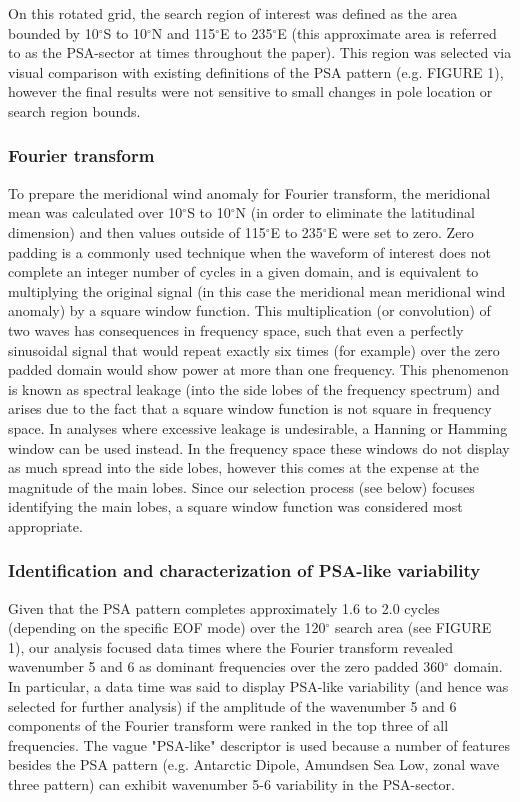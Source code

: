 On this rotated grid, the search region of interest was defined as the area bounded by 10$^{\circ}$S to 10$^{\circ}$N and 115$^{\circ}$E to 235$^{\circ}$E (this approximate area is referred to as the PSA-sector at times throughout the paper). This region was selected via visual comparison with existing definitions of the PSA pattern (e.g. FIGURE 1), however the final results were not sensitive to small changes in pole location or search region bounds.

\subsubsection{Fourier transform}

To prepare the meridional wind anomaly for Fourier transform, the meridional mean was calculated over 10$^{\circ}$S to 10$^{\circ}$N (in order to eliminate the latitudinal dimension) and then values outside of 115$^{\circ}$E to 235$^{\circ}$E were set to zero. Zero padding is a commonly used technique when the waveform of interest does not complete an integer number of cycles in a given domain, and is equivalent to multiplying the original signal (in this case the meridional mean meridional wind anomaly) by a square window function. This multiplication (or convolution) of two waves has consequences in frequency space, such that even a perfectly sinusoidal signal that would repeat exactly six times (for example) over the zero padded domain would show power at more than one frequency. This phenomenon is known as spectral leakage (into the side lobes of the frequency spectrum) and arises due to the fact that a square window function is not square in frequency space. In analyses where excessive leakage is undesirable, a Hanning or Hamming window can be used instead. In the frequency space these windows do not display as much spread into the side lobes, however this comes at the expense at the magnitude of the main lobes. Since our selection process (see below) focuses identifying the main lobes, a square window function was considered most appropriate.

\subsubsection{Identification and characterization of PSA-like variability}

Given that the PSA pattern completes approximately 1.6 to 2.0 cycles (depending on the specific EOF mode) over the 120$^{\circ}$ search area (see FIGURE 1), our analysis focused data times where the Fourier transform revealed wavenumber 5 and 6 as dominant frequencies over the zero padded 360$^{\circ}$ domain. In particular, a data time was said to display PSA-like variability (and hence was selected for further analysis) if the amplitude of the wavenumber 5 and 6 components of the Fourier transform were ranked in the top three of all frequencies. The vague "PSA-like" descriptor is used because a number of features besides the PSA pattern (e.g. Antarctic Dipole, Amundsen Sea Low, zonal wave three pattern) can exhibit wavenumber 5-6 variability in the PSA-sector.

